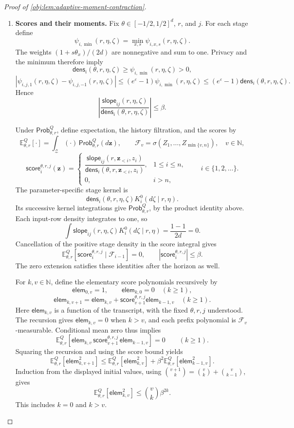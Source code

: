 \documentclass[11pt]{article}
\begin{document}
\begin{proof}[Proof of \cref{obj:lem:adaptive-moment-contraction}]
\begin{enumerate}
\item \textbf{Scores and their moments.}
Fix \(\theta\in[-1/2,1/2]^d\), \(r\), and \(j\). For each stage define
\[
\psi_{i,\min}(r,\eta,\zeta)
=\min_{x,s}\psi_{i,x,s}(r,\eta,\zeta).
\]
The weights \((1+s\theta_x)/(2d)\) are nonnegative and sum to one. Privacy and the minimum therefore imply
\[
\mathsf{dens}_i(\theta,r,\eta,\zeta)
\ge\psi_{i,\min}(r,\eta,\zeta)>0,
\]
\[
\left|\psi_{i,j,1}(r,\eta,\zeta)
      -\psi_{i,j,-1}(r,\eta,\zeta)\right|
\le(e^\varepsilon-1)\psi_{i,\min}(r,\eta,\zeta)
\le(e^\varepsilon-1)\mathsf{dens}_i(\theta,r,\eta,\zeta).
\]
Hence
\[
\left|
\frac{\mathsf{slope}_{ij}(r,\eta,\zeta)}
     {\mathsf{dens}_i(\theta,r,\eta,\zeta)}
\right|
\le\beta.
\]

Under \(\mathsf{Prob}^Q_{\theta,r}\), define expectation, the history filtration, and the scores by
\[
\mathbb E^Q_{\theta,r}[\cdot]
=\int_{\mathcal Z}(\cdot)\,\mathsf{Prob}^Q_{\theta,r}(d\mathbf z),
\qquad
\mathcal F_v=\sigma(Z_1,\ldots,Z_{\min\{v,n\}}),
\quad v\in\mathbb N,
\]
\[
\mathsf{score}^{\theta,r,j}_i(\mathbf z)
=
\begin{cases}
\dfrac{\mathsf{slope}_{ij}(r,\mathbf z_{<i},z_i)}
      {\mathsf{dens}_i(\theta,r,\mathbf z_{<i},z_i)},
 &1\le i\le n,\\[6pt]
0,&i>n,
\end{cases}
\qquad i\in\{1,2,\ldots\}.
\]
The parameter-specific stage kernel is
\[
\mathsf{dens}_i(\theta,r,\eta,\zeta)
 K_i^0(d\zeta\mid r,\eta).
\]
Its successive kernel integrations give
\(\mathsf{Prob}^Q_{\theta,r}\), by the product identity above. Each input-row density integrates to one, so
\[
\int\mathsf{slope}_{ij}(r,\eta,\zeta)
 K_i^0(d\zeta\mid r,\eta)
=\frac{1-1}{2d}=0.
\]
Cancellation of the positive stage density in the score integral gives
\[
\mathbb E^Q_{\theta,r}
 [\mathsf{score}^{\theta,r,j}_i\mid\mathcal F_{i-1}]
=0,
\qquad
|\mathsf{score}^{\theta,r,j}_i|\le\beta.
\]
The zero extension satisfies these identities after the horizon as well.

For \(k,v\in\mathbb N\), define the elementary score polynomials recursively by
\[
\mathsf{elem}_{0,v}=1,
\qquad
\mathsf{elem}_{k,0}=0\quad(k\ge1),
\]
\[
\mathsf{elem}_{k,v+1}
=\mathsf{elem}_{k,v}
+\mathsf{score}^{\theta,r,j}_{v+1}\mathsf{elem}_{k-1,v}
\quad(k\ge1).
\]
Here \(\mathsf{elem}_{k,v}\) is a function of the transcript, with the fixed
\(\theta,r,j\) understood. The recursion gives
\(\mathsf{elem}_{k,v}=0\) when \(k>v\), and each prefix polynomial is
\(\mathcal F_v\)-measurable. Conditional mean zero thus implies
\[
\mathbb E^Q_{\theta,r}
 \left[
 \mathsf{elem}_{k,v}\,
 \mathsf{score}^{\theta,r,j}_{v+1}\,
 \mathsf{elem}_{k-1,v}
 \right]=0
\qquad(k\ge1).
\]
Squaring the recursion and using the score bound yields
\[
\mathbb E^Q_{\theta,r}[\mathsf{elem}_{k,v+1}^2]
\le
\mathbb E^Q_{\theta,r}[\mathsf{elem}_{k,v}^2]
+\beta^2\mathbb E^Q_{\theta,r}[\mathsf{elem}_{k-1,v}^2].
\]
Induction from the displayed initial values, using
\(\binom{v+1}{k}=\binom vk+\binom v{k-1}\), gives
\[
\mathbb E^Q_{\theta,r}[\mathsf{elem}_{k,v}^2]
\le\binom vk\beta^{2k}.
\]
This includes \(k=0\) and \(k>v\).


\end{enumerate}
\end{proof}
\end{document}
